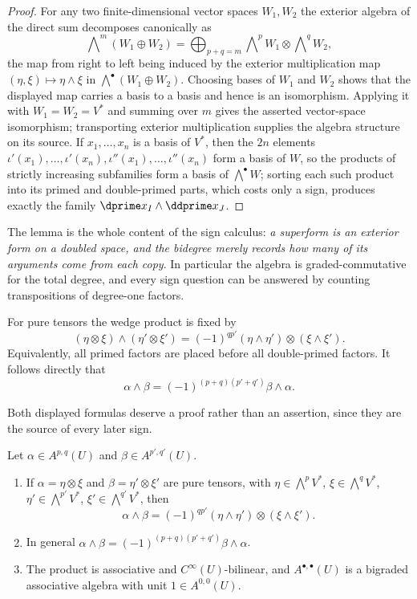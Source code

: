 \begin{proof}
For any two finite-dimensional vector spaces $W_1,W_2$ the exterior algebra
of the direct sum decomposes canonically as
\[
 \bigwedge\nolimits^{m}(W_1\oplus W_2)
 =\bigoplus_{p+q=m}
   \bigwedge\nolimits^{p}W_1\otimes\bigwedge\nolimits^{q}W_2 ,
\]
the map from right to left being induced by the exterior multiplication map
$(\eta,\xi)\mapsto \eta\wedge\xi$ in $\bigwedge^\bullet(W_1\oplus W_2)$.
Choosing bases of $W_1$ and $W_2$ shows that the displayed map carries a
basis to a basis and hence is an isomorphism.  Applying it with
$W_1=W_2=V^*$ and summing over $m$ gives the asserted vector-space
isomorphism; transporting exterior multiplication supplies the algebra
structure on its source.  If $x_1,\ldots,x_n$ is a basis of $V^*$, then the $2n$ elements
$\iota'(x_1),\ldots,\iota'(x_n),\iota''(x_1),\ldots,\iota''(x_n)$ form a basis
of $W$, so the products of strictly increasing subfamilies form a basis of
$\bigwedge^\bullet W$; sorting each such product into its primed and
double-primed parts, which costs only a sign, produces exactly the family
$\dprime x_I\wedge\ddprime x_J$.
\end{proof}

The lemma is the whole content of the sign calculus: \emph{a superform is an
exterior form on a doubled space, and the bidegree merely records how many of
its arguments come from each copy}.  In particular the algebra is
graded-commutative for the total degree, and every sign question can be
answered by counting transpositions of degree-one factors.

For pure tensors the wedge product is fixed by
\[
(\eta\otimes\xi)\wedge(\eta'\otimes\xi')
 =(-1)^{q p'}(\eta\wedge\eta')\otimes(\xi\wedge\xi').
\]
Equivalently, all primed factors are placed before all double-primed factors.
It follows directly that
\[
             \alpha\wedge\beta=(-1)^{(p+q)(p'+q')}
             \beta\wedge\alpha.
\]

Both displayed formulas deserve a proof rather than an assertion, since they
are the source of every later sign.

\begin{proposition}
\label{prop:ch09-wedge-signs}
Let $\alpha\in A^{p,q}(U)$ and $\beta\in A^{p',q'}(U)$.
\begin{enumerate}
\item If $\alpha=\eta\otimes\xi$ and
  $\beta=\eta'\otimes\xi'$ are pure tensors, with
  $\eta\in\bigwedge^pV^*$, $\xi\in\bigwedge^qV^*$,
  $\eta'\in\bigwedge^{p'}V^*$, $\xi'\in\bigwedge^{q'}V^*$, then
  \[
   \alpha\wedge\beta=(-1)^{qp'}(\eta\wedge\eta')\otimes(\xi\wedge\xi').
  \]
\item In general
  $\alpha\wedge\beta=(-1)^{(p+q)(p'+q')}\beta\wedge\alpha$.
\item The product is associative and
  $C^\infty(U)$-bilinear, and $A^{\bullet,\bullet}(U)$ is a bigraded
  associative algebra with unit $1\in A^{0,0}(U)$.
\end{enumerate}
\end{proposition}

